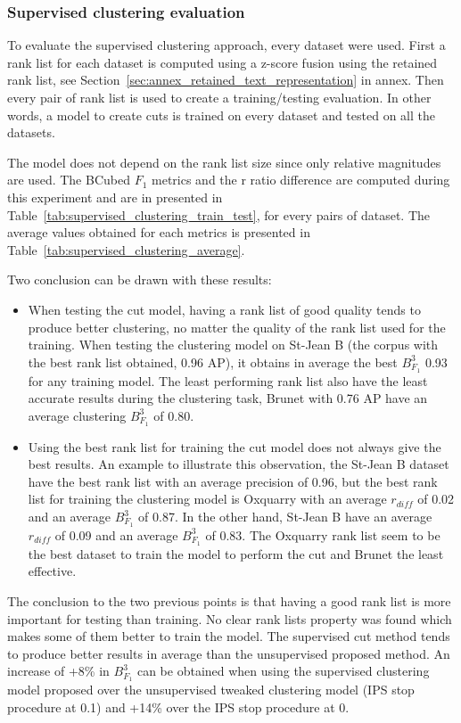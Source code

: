 \subsubsection{Supervised clustering evaluation}

To evaluate the supervised clustering approach, every dataset were used.
First a rank list for each dataset is computed using a z-score fusion using the retained rank list, see Section~\ref{sec:annex_retained_text_representation} in annex.
Then every pair of rank list is used to create a training/testing evaluation.
In other words, a model to create cuts is trained on every dataset and tested on all the datasets.

The model does not depend on the rank list size since only relative magnitudes are used.
The BCubed $F_1$ metrics and the r ratio difference are computed during this experiment and are in presented in Table~\ref{tab:supervised_clustering_train_test}, for every pairs of dataset.
The average values obtained for each metrics is presented in Table~\ref{tab:supervised_clustering_average}.

Two conclusion can be drawn with these results:
\begin{itemize}
  \item
  When testing the cut model, having a rank list of good quality tends to produce better clustering, no matter the quality of the rank list used for the training.
  When testing the clustering model on St-Jean B (the corpus with the best rank list obtained, 0.96 AP), it obtains in average the best $B^3_{F_1}$ 0.93 for any training model.
  The least performing rank list also have the least accurate results during the clustering task, Brunet with 0.76 AP have an average clustering $B^3_{F_1}$ of 0.80.
  \item
  Using the best rank list for training the cut model does not always give the best results.
  An example to illustrate this observation, the St-Jean B dataset have the best rank list with an average precision of 0.96, but the best rank list for training the clustering model is Oxquarry with an average $r_{diff}$ of 0.02 and an average $B^3_{F_1}$ of 0.87.
  In the other hand, St-Jean B have an average $r_{diff}$ of 0.09 and an average $B^3_{F_1}$ of 0.83.
  The Oxquarry rank list seem to be the best dataset to train the model to perform the cut and Brunet the least effective.
\end{itemize}

The conclusion to the two previous points is that having a good rank list is more important for testing than training.
No clear rank lists property was found which makes some of them better to train the model.
The supervised cut method tends to produce better results in average than the unsupervised proposed method.
An increase of +8\% in $B^3_{F_1}$ can be obtained when using the supervised clustering model proposed over the unsupervised tweaked clustering model (IPS stop procedure at 0.1) and +14\% over the IPS stop procedure at 0.

